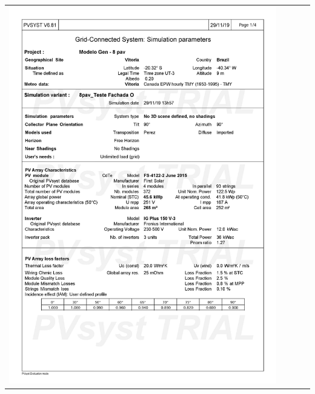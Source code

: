 \begin{table}[H]
    \centering
    \begin{tabular}{l}
        \includegraphics[width=0.9\textwidth]{figures/attachments/resultpv7.jpg}
    \end{tabular}
\end{table}
\pagebreak
